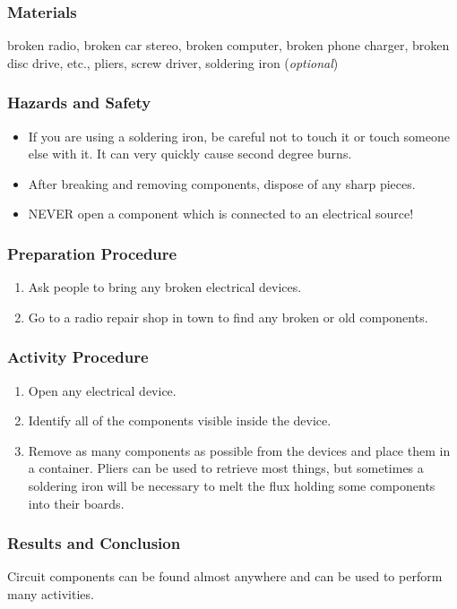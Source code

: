 \subsubsection*{Materials}
broken radio, broken car stereo, broken computer, broken phone charger, broken disc drive, etc., pliers, screw driver, soldering iron (\textit{optional})

\subsubsection*{Hazards and Safety}
\begin{itemize}
\item{If you are using a soldering iron, be careful not to touch it or touch someone else with it. It can very quickly cause second degree burns.} 
\item{After breaking and removing components, dispose of any sharp pieces.} 
\item{NEVER open a component which is connected to an electrical source!} 
\end{itemize}

\subsubsection*{Preparation Procedure}
\begin{enumerate}
\item{Ask people to bring any broken electrical devices.} 
\item{Go to a radio repair shop in town to find any broken or old components.} 
\end{enumerate}

\subsubsection*{Activity Procedure}
\begin{enumerate}
\item{Open any electrical device.} 
\item{Identify all of the components visible inside the device.} 
\item{Remove as many components as possible from the devices and place them in a container. Pliers can be used to retrieve most things, but sometimes a soldering iron will be necessary to melt the flux holding some components into their boards.} 
\end{enumerate}

\subsubsection*{Results and Conclusion}
Circuit components can be found almost anywhere and can be used to perform many activities.

